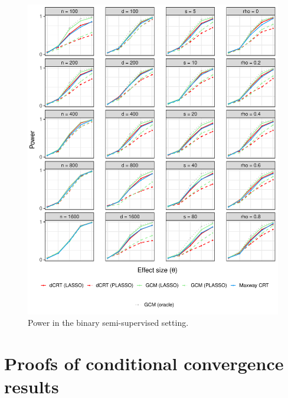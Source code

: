 \documentclass[12pt]{article}
\theoremstyle{definition}
\theoremstyle{remark}
\begin{document}
\begin{figure}[!ht]
	\centering
	\includegraphics[scale = 1]{figures/binomial_semi_supervised_setting_alternative.pdf}
	\caption{Power in the binary semi-supervised setting.}
	\label{fig:binomial_semi-supervised_alternative}
\end{figure}



\clearpage

\section{Proofs of conditional convergence results} \label{sec:conditional-convergence-proofs}
\end{document}
